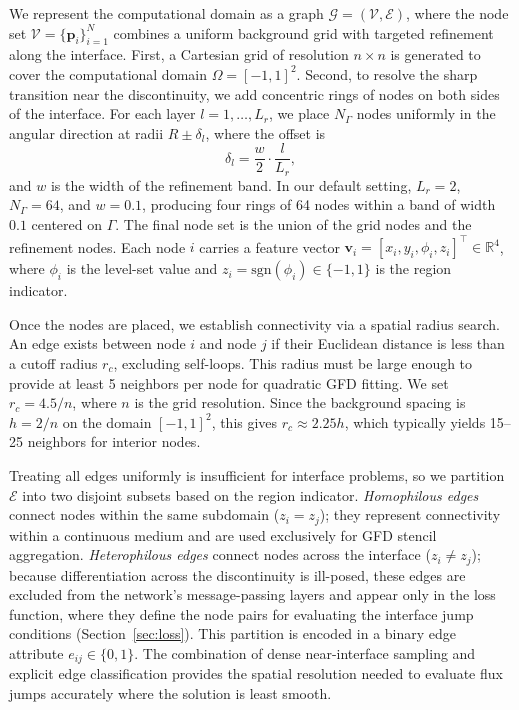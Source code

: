 \documentclass[11pt]{article}
\theoremstyle{definition}
\theoremstyle{remark}
\theoremstyle{plain}
\begin{document}
We represent the computational domain as a graph $\mathcal{G} = (\mathcal{V}, \mathcal{E})$, where the node set $\mathcal{V} = \{\mathbf{p}_i\}_{i=1}^{N}$ combines a uniform background grid with targeted refinement along the interface. First, a Cartesian grid of resolution $n \times n$ is generated to cover the computational domain $\Omega = [-1,1]^2$. Second, to resolve the sharp transition near the discontinuity, we add concentric rings of nodes on both sides of the interface. For each layer $l = 1, \ldots, L_r$, we place $N_\Gamma$ nodes uniformly in the angular direction at radii $R \pm \delta_l$, where the offset is
\begin{equation}
    \delta_l = \frac{w}{2} \cdot \frac{l}{L_r},
\end{equation}
and $w$ is the width of the refinement band. In our default setting, $L_r = 2$, $N_\Gamma = 64$, and $w = 0.1$, producing four rings of 64 nodes within a band of width $0.1$ centered on $\Gamma$. The final node set is the union of the grid nodes and the refinement nodes. Each node $i$ carries a feature vector $\mathbf{v}_i = [x_i, y_i, \phi_i, z_i]^\top \in \mathbb{R}^4$, where $\phi_i$ is the level-set value and $z_i = \text{sgn}(\phi_i) \in \{-1, 1\}$ is the region indicator.

Once the nodes are placed, we establish connectivity via a spatial radius search. An edge exists between node $i$ and node $j$ if their Euclidean distance is less than a cutoff radius $r_c$, excluding self-loops. This radius must be large enough to provide at least 5 neighbors per node for quadratic GFD fitting. We set $r_c = 4.5 / n$, where $n$ is the grid resolution. Since the background spacing is $h = 2/n$ on the domain $[-1,1]^2$, this gives $r_c \approx 2.25 h$, which typically yields 15--25 neighbors for interior nodes.

Treating all edges uniformly is insufficient for interface problems, so we partition $\mathcal{E}$ into two disjoint subsets based on the region indicator. \textit{Homophilous edges} connect nodes within the same subdomain ($z_i = z_j$); they represent connectivity within a continuous medium and are used exclusively for GFD stencil aggregation. \textit{Heterophilous edges} connect nodes across the interface ($z_i \neq z_j$); because differentiation across the discontinuity is ill-posed, these edges are excluded from the network's message-passing layers and appear only in the loss function, where they define the node pairs for evaluating the interface jump conditions (Section~\ref{sec:loss}). This partition is encoded in a binary edge attribute $e_{ij} \in \{0, 1\}$. The combination of dense near-interface sampling and explicit edge classification provides the spatial resolution needed to evaluate flux jumps accurately where the solution is least smooth.
\end{document}
